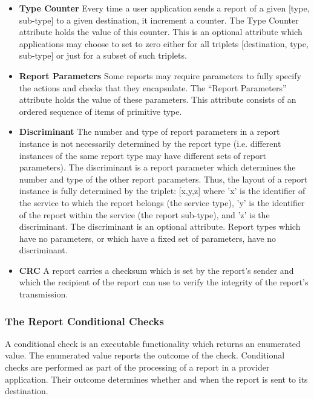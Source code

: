 \begin{itemize}
\item \textbf{Type Counter}
Every time a user application sends a report of a given [type, sub-type] to a given destination, it increment a counter. The Type Counter attribute holds the value of this counter. This is an optional attribute which applications may choose to set to zero either for all triplets [destination, type, sub-type] or just for a subset of such triplets.

\item \textbf{Report Parameters}
Some reports may require parameters to fully specify the actions and checks that they encapsulate. The “Report Parameters” attribute holds the value of these parameters. This attribute consists of an ordered sequence of items of primitive type. 
\item \textbf{Discriminant}
The number and type of report parameters in a report instance is not necessarily determined by the report type (i.e. different instances of the same report type may have different sets of report parameters). The discriminant is a report parameter which determines the number and type of the other report parameters. Thus, the layout of a report instance is fully determined by the triplet: [x,y,z] where 'x' is the identifier of the service to which the report belongs (the service type), 'y' is the identifier of the report within the service (the report sub-type), and 'z' is the discriminant.  The discriminant is an optional attribute. Report types which have no parameters, or which have a fixed set of parameters, have no discriminant.
\item \textbf{CRC}
A report carries a checksum which is set by the report's sender and which the recipient of the report can use to verify the integrity of the report's transmission. 

\end{itemize}


\subsubsection{The Report Conditional Checks}\label{sec:RepConditionalChecks}

A conditional check is an executable functionality which returns an enumerated value. The enumerated value reports the outcome of the check. Conditional checks are performed as part of the processing of a report in a provider application. Their outcome determines whether and when the report is sent to its destination. 

